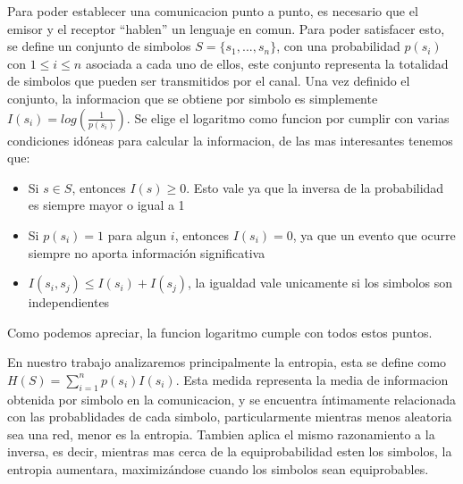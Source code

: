 Para poder establecer una comunicacion punto a punto, es necesario que el emisor y el receptor "`hablen"' un lenguaje en comun. Para poder satisfacer esto, se define un conjunto de simbolos $S = \{ s_1, ..., s_n \}$, con una probabilidad $p(s_i)$ con $1 \leq i \leq n$ asociada a cada uno de ellos, este conjunto representa la totalidad de simbolos que pueden ser transmitidos por el canal. Una vez definido el conjunto, la informacion que se obtiene por simbolo es simplemente $I(s_i) = log(\frac{1}{p(s_i)})$. Se elige el logaritmo como funcion por cumplir con varias condiciones idóneas para calcular la informacion, de las mas interesantes tenemos que:

\begin{itemize}
	\item Si $s \in S$, entonces $I(s) \geq 0$. Esto vale ya que la inversa de la probabilidad es siempre mayor o igual a 1
	\item Si $p(s_i) = 1$ para algun $i$, entonces $I(s_i) = 0$, ya que un evento que ocurre siempre no aporta información significativa
	\item $I(s_i, s_j) \leq I(s_i) + I(s_j)$, la igualdad vale unicamente si los simbolos son independientes
\end{itemize}

Como podemos apreciar, la funcion logaritmo cumple con todos estos puntos.

En nuestro trabajo analizaremos principalmente la entropia, esta se define como $H(S) = \sum\limits_{i=1}^n p(s_i)I(s_i)$. Esta medida representa la media de informacion obtenida por simbolo en la comunicacion, y se encuentra íntimamente relacionada con las probablidades de cada simbolo, particularmente mientras menos aleatoria sea una red, menor es la entropia. Tambien aplica el mismo razonamiento a la inversa, es decir, mientras mas cerca de la equiprobabilidad esten los simbolos, la entropia aumentara, maximizándose cuando los simbolos sean equiprobables.


